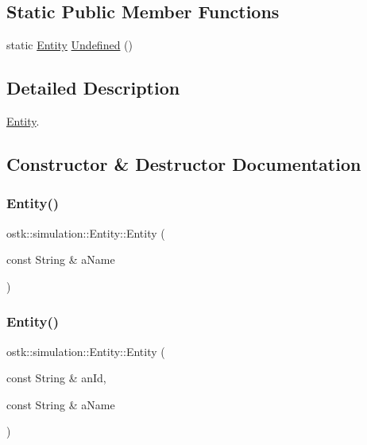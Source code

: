 \subsection*{Static Public Member Functions}
\begin{DoxyCompactItemize}
\item 
static \hyperlink{classostk_1_1simulation_1_1_entity}{Entity} \hyperlink{classostk_1_1simulation_1_1_entity_aa42c610f1b96197f9fbf45711fe6a479}{Undefined} ()
\end{DoxyCompactItemize}


\subsection{Detailed Description}
\hyperlink{classostk_1_1simulation_1_1_entity}{Entity}. 

\subsection{Constructor \& Destructor Documentation}
\mbox{\label{classostk_1_1simulation_1_1_entity_a929819736161db5935b29b84da8a97aa}} 
\subsubsection{\texorpdfstring{Entity()}{Entity()}\hspace{0.1cm}{\footnotesize\ttfamily [1/2]}}
{\footnotesize\ttfamily ostk\+::simulation\+::\+Entity\+::\+Entity (\begin{DoxyParamCaption}\item[{const String \&}]{a\+Name }\end{DoxyParamCaption})}

\mbox{\label{classostk_1_1simulation_1_1_entity_ae4ee439011cfcb1811d31bdb8db871fa}} 
\subsubsection{\texorpdfstring{Entity()}{Entity()}\hspace{0.1cm}{\footnotesize\ttfamily [2/2]}}
{\footnotesize\ttfamily ostk\+::simulation\+::\+Entity\+::\+Entity (\begin{DoxyParamCaption}\item[{const String \&}]{an\+Id,  }\item[{const String \&}]{a\+Name }\end{DoxyParamCaption})}



